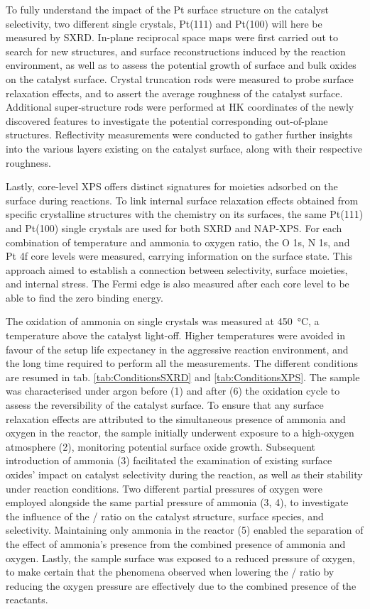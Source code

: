 To fully understand the impact of the Pt surface structure on the catalyst selectivity, two different single crystals, Pt(111) and Pt(100) will here be measured by SXRD.
In-plane reciprocal space maps were first carried out to search for new structures, and surface reconstructions induced by the reaction environment, as well as to assess the potential growth of surface and bulk oxides on the catalyst surface.
Crystal truncation rods were measured to probe surface relaxation effects, and to assert the average roughness of the catalyst surface.
Additional super-structure rods were performed at HK coordinates of the newly discovered features to investigate the potential corresponding out-of-plane structures.
Reflectivity measurements were conducted to gather further insights into the various layers existing on the catalyst surface, along with their respective roughness.

Lastly, core-level XPS offers distinct signatures for moieties adsorbed on the surface during reactions.
To link internal surface relaxation effects obtained from specific crystalline structures with the chemistry on its surfaces, the same Pt(111) and Pt(100) single crystals are used for both SXRD and NAP-XPS.
For each combination of temperature and ammonia to oxygen ratio, the O 1s, N 1s, and Pt 4f core levels were measured, carrying information on the surface state.
This approach aimed to establish a connection between selectivity, surface moieties, and internal stress.
The Fermi edge is also measured after each core level to be able to find the zero binding energy.

The oxidation of ammonia on single crystals was measured at \qty{450}{\degreeCelsius}, a temperature above the catalyst light-off.
Higher temperatures were avoided in favour of the setup life expectancy in the aggressive reaction environment, and the long time required to perform all the measurements.
The different conditions are resumed in tab. \ref{tab:ConditionsSXRD} and \ref{tab:ConditionsXPS}.
The sample was characterised under argon before (1) and after (6) the oxidation cycle to assess the reversibility of the catalyst surface.
To ensure that any surface relaxation effects are attributed to the simultaneous presence of ammonia and oxygen in the reactor, the sample initially underwent exposure to a high-oxygen atmosphere (2), monitoring potential surface oxide growth.
Subsequent introduction of ammonia (3) facilitated the examination of existing surface oxides' impact on catalyst selectivity during the reaction, as well as their stability under reaction conditions.
Two different partial pressures of oxygen were employed alongside the same partial pressure of ammonia (3, 4), to investigate the influence of the / ratio on the catalyst structure, surface species, and selectivity.
Maintaining only ammonia in the reactor (5) enabled the separation of the effect of ammonia's presence from the combined presence of ammonia and oxygen.
Lastly, the sample surface was exposed to a reduced pressure of oxygen, to make certain that the phenomena observed when lowering the / ratio by reducing the oxygen pressure are effectively due to the combined presence of the reactants.

